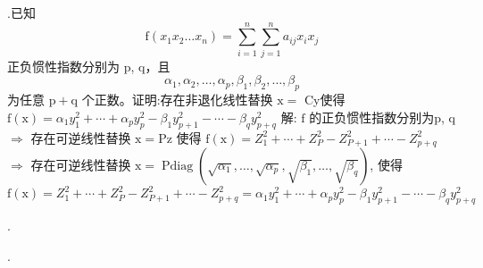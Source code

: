 \documentclass{article}
\begin{document}
\vspace{1ex}
{.}已知
$$
\mathrm{f}\left(x_{1} x_{2} \ldots x_{n}\right)=\sum_{i=1}^{n} \sum_{j=1}^{n} a_{i j} x_{i} x_{j}
$$
正负惯性指数分别为 p, q，且
$$
\alpha_{1}, \alpha_{2}, \ldots, \alpha_{p}, \beta_{1}, \beta_{2}, \ldots, \beta_{p}
$$
为任意 $\mathrm{p}+\mathrm{q}$ 个正数。证明:存在非退化线性替换 $\mathrm{x}=$ Cy使得 $\mathrm{f}(\mathrm{x})=\alpha_{1} y_{1}^{2}+\cdots+\alpha_{p} y_{p}^{2}-\beta_{1} y_{p+1}^{2}-\cdots-\beta_{q} y_{p+q}^{2}$
解: $\mathrm{f}$ 的正负惯性指数分别为p, q
$\Rightarrow$ 存在可逆线性替换 $\mathrm{x}=\mathrm{Pz}$ 使得 $\mathrm{f}(\mathrm{x})=Z_{1}^{2}+\cdots+Z_{P}^{2}-Z_{P+1}^{2}+\cdots-Z_{p+q}^{2}$
$\Rightarrow$ 存在可逆线性替换 $\mathrm{x}=\operatorname{Pdiag}\left(\sqrt{\alpha_{1}}, \ldots, \sqrt{\alpha_{p}}, \sqrt{\beta_{1}}, \ldots, \sqrt{\beta_{q}}\right)$, 使得
$$
\mathrm{f}(\mathrm{x})=Z_{1}^{2}+\cdots+Z_{P}^{2}-Z_{P+1}^{2}+\cdots-Z_{p+q}^{2}=\alpha_{1} y_{1}^{2}+\cdots+\alpha_{p} y_{p}^{2}-\beta_{1} y_{p+1}^{2}-\cdots-\beta_{q} y_{p+q}^{2}
$$

\vspace{1ex}
{.}

\vspace{1ex}
{.}
\end{document}
